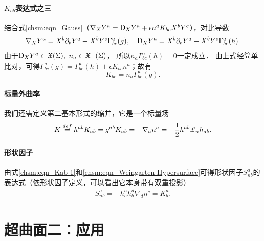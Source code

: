 \paragraph{$K_{ab}$表达式之三}
结合式\eqref{chsm:eqn_Gauss}（${\nabla}_{X} Y^a = {\rm D}_{X} Y^a
+\epsilon n^a K_{bc}  X^bY^c$），对比导数
\begin{align*}
    \nabla_{X}  Y^a  = X^b \partial_b Y^a + X^b Y^c \Gamma^a_{bc}(g), \quad
    {\rm D}_{X} Y^a  = X^b \partial_b Y^a + X^b Y^c \Gamma^a_{bc}(h) .
\end{align*}
由于${\rm D}_{X} Y^a \in \mathfrak{X}(\Sigma),\ {n}_a\in \mathfrak{X}^\bot(\Sigma)$，
所以${n}_a\Gamma_{bc}^a(h)=0$一定成立．
由上式经简单比对，可得$\Gamma^a_{bc}(g) = \Gamma^a_{bc}(h) +\epsilon K_{bc}  {n}^a$；故有
\begin{equation}\label{chsm:eqn_K-Christoffel}
    K_{bc} = {n}_a \Gamma_{bc}^a(g) .
\end{equation}


\paragraph{标量外曲率}
我们还需定义第二基本形式的缩并，它是一个标量场
\begin{equation}\label{chsm:eqn_K-scalar}
    K \overset{def}{=} h^{ab} K_{ab} = g^{ab} K_{ab} =-\nabla_{a} {n}^a
    =-\frac{1}{2}h^{ab}\Lie_{n} h_{ab}.  %
\end{equation}


\paragraph{形状因子}
由式\eqref{chsm:eqn_Kab-1}和\eqref{chsm:eqn_Weingarten-Hypersurface}可得形状因子$S^a_{n b}$的
表达式（依形状因子定义，可以看出它本身带有双重投影）
\begin{align}
    S^a_{n b} =- h_c^a h_b^d \nabla_d n^c= K_{b}^a .
\end{align}






\section{超曲面二：应用}



